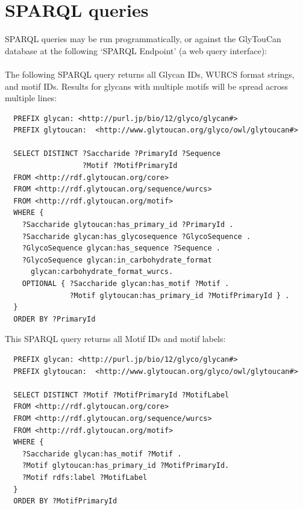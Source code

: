\documentclass[12pt,a4paper]{article}
\begin{document}
\section{SPARQL queries}
\label{sec:sparql_queries}
SPARQL queries may be run programmatically, or against the GlyTouCan database at the following `SPARQL Endpoint' (a web query interface):\\

\noindent {}\\

\noindent The following SPARQL query returns all Glycan IDs, WURCS format strings, and motif IDs. Results for glycans with multiple motifs will be spread across multiple lines:

\singlespace
\begin{verbatim}
  PREFIX glycan: <http://purl.jp/bio/12/glyco/glycan#>
  PREFIX glytoucan:  <http://www.glytoucan.org/glyco/owl/glytoucan#>

  SELECT DISTINCT ?Saccharide ?PrimaryId ?Sequence 
                  ?Motif ?MotifPrimaryId
  FROM <http://rdf.glytoucan.org/core>
  FROM <http://rdf.glytoucan.org/sequence/wurcs>
  FROM <http://rdf.glytoucan.org/motif>
  WHERE {
    ?Saccharide glytoucan:has_primary_id ?PrimaryId .
    ?Saccharide glycan:has_glycosequence ?GlycoSequence .
    ?GlycoSequence glycan:has_sequence ?Sequence .
    ?GlycoSequence glycan:in_carbohydrate_format 
      glycan:carbohydrate_format_wurcs.
    OPTIONAL { ?Saccharide glycan:has_motif ?Motif .
               ?Motif glytoucan:has_primary_id ?MotifPrimaryId } .
  }
  ORDER BY ?PrimaryId
\end{verbatim}
\doublespace

\newpage
\noindent This SPARQL query returns all Motif IDs and motif labels:

\singlespace
\begin{verbatim}
  PREFIX glycan: <http://purl.jp/bio/12/glyco/glycan#>
  PREFIX glytoucan:  <http://www.glytoucan.org/glyco/owl/glytoucan#>

  SELECT DISTINCT ?Motif ?MotifPrimaryId ?MotifLabel
  FROM <http://rdf.glytoucan.org/core>
  FROM <http://rdf.glytoucan.org/sequence/wurcs>
  FROM <http://rdf.glytoucan.org/motif>
  WHERE {
    ?Saccharide glycan:has_motif ?Motif .
    ?Motif glytoucan:has_primary_id ?MotifPrimaryId.
    ?Motif rdfs:label ?MotifLabel
  }
  ORDER BY ?MotifPrimaryId
  
\end{verbatim}
\doublespace
\end{document}
